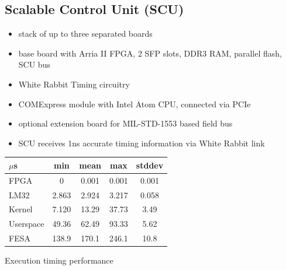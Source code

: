 \documentclass[25pt,halfparskip-,pagesize]{scrartcl}
\begin{document}
\begin{multicols*}{3}
\section{Scalable Control Unit (SCU)}
\begin{itemize}
  \item stack of up to three separated boards
  \item base board with Arria II FPGA, 2 SFP slots, DDR3 RAM, parallel flash, SCU bus
  \item White Rabbit Timing circuitry
  \item COMExpress module with Intel Atom CPU, connected via PCIe
  \item optional extension board for MIL-STD-1553 based field bus
  \item SCU receives 1ns accurate timing information via White Rabbit link
\end{itemize}

\begin{center}
  \begin{tabular}{l|c|c|c|c}

   $\mu$s    & min   & mean  & max   & stddev \\
   \hline
    FPGA      & 0 & 0.001 & 0.001 & 0.001 \\
    LM32      & 2.863 & 2.924 & 3.217 & 0.058  \\
    Kernel    & 7.120 & 13.29 & 37.73 & 3.49   \\
    Userspace & 49.36 & 62.49 & 93.33 & 5.62   \\
    FESA      & 138.9 & 170.1 & 246.1 & 10.8 \\
   \end{tabular}
  \caption{Execution timing performance}
\label{tab:stat_table}
\end{center}


\end{multicols*}
\end{document}

